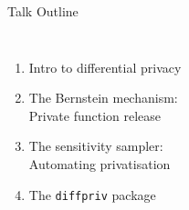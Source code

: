 \documentclass{beamer}
\newcommand{\code}[1]{\texttt{#1}\xspace}
\newcommand{\pck}{\code{diffpriv}}
\begin{document}
\begin{frame}{Talk Outline}
\begin{columns}[T,onlytextwidth]
	\begin{enumerate}
		\item Intro to differential privacy \\[2.4em]
		\item The Bernstein mechanism: \\ Private function release\\[2.4em]
		\item The sensitivity sampler: \\ Automating privatisation\\[2.4em]
		\item The \pck package
	\end{enumerate}


\end{columns}
\end{frame}
\end{document}
